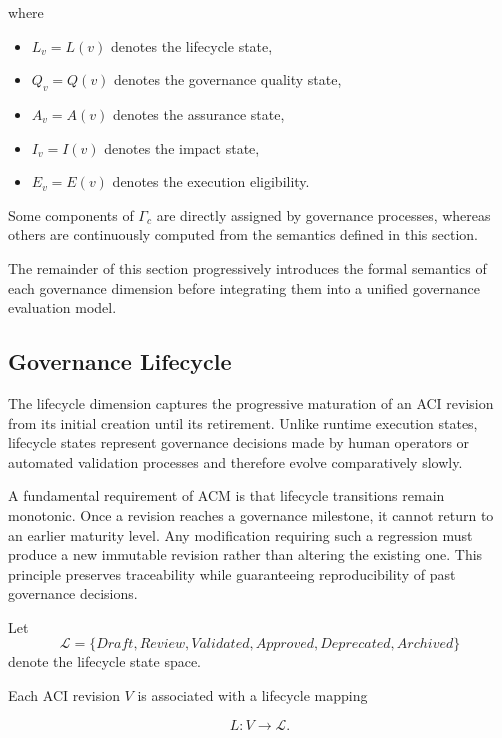 \documentclass[10pt]{article}
\begin{document}
where

\begin{itemize}
    \item $L_v = L(v)$ denotes the lifecycle state,
    \item $Q_v = Q(v)$ denotes the governance quality state,
    \item $A_v = A(v)$ denotes the assurance state,
    \item $I_v = I(v)$ denotes the impact state,
    \item $E_v = E(v)$ denotes the execution eligibility.
\end{itemize}

Some components of $\Gamma_{c}$ are directly assigned by governance processes,
whereas others are continuously computed from the semantics defined in this
section.

The remainder of this section progressively introduces the formal semantics of
each governance dimension before integrating them into a unified governance
evaluation model.

\subsection{Governance Lifecycle}
\label{subsec:lifecycle}

The lifecycle dimension captures the progressive maturation of an ACI revision
from its initial creation until its retirement. Unlike runtime execution
states, lifecycle states represent governance decisions made by human operators
or automated validation processes and therefore evolve comparatively slowly.

A fundamental requirement of ACM is that lifecycle transitions remain
monotonic. Once a revision reaches a governance milestone, it cannot return to
an earlier maturity level. Any modification requiring such a regression must
produce a new immutable revision rather than altering the existing one. This
principle preserves traceability while guaranteeing reproducibility of past
governance decisions.

Let
\begin{equation}
\mathcal{L}
=
\{
Draft,
Review,
Validated,
Approved,
Deprecated,
Archived
\}
\label{eq:lifecycle}
\end{equation}
denote the lifecycle state space.

Each ACI revision $V$ is associated with a lifecycle mapping

\[
L:V\rightarrow\mathcal{L}.
\]
\end{document}
